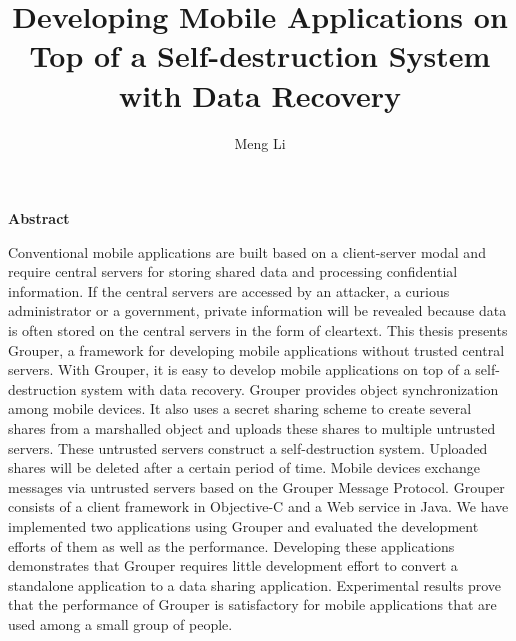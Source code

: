 \documentclass[a4paper,11pt]{report}
\title{Developing Mobile Applications on Top of a Self-destruction System with Data Recovery}
\author{Meng Li}
\begin{document}
		
\maketitle
\thispagestyle{empty}
\newpage

\thispagestyle{empty}
\vspace*{20pt plus 1fil}
\noindent
\begin{center}
{\bf Abstract}
\vspace{5mm}
\end{center}
Conventional mobile applications are built based on a client-server modal and require central servers for storing shared data and processing confidential information.
If the central servers are accessed by an attacker, a curious administrator or a government, private information will be revealed because data is often stored on the central servers in the form of cleartext.
This thesis presents Grouper, a framework for developing mobile applications without trusted central servers.
With Grouper, it is easy to develop mobile applications on top of a self-destruction system with data recovery.
Grouper provides object synchronization among mobile devices.
It also uses a secret sharing scheme to create several shares from a marshalled object and uploads these shares to multiple untrusted servers. 
These untrusted servers construct a self-destruction system. 
Uploaded shares will be deleted after a certain period of time. 
Mobile devices exchange messages via untrusted servers based on the Grouper Message Protocol. 
Grouper consists of a client framework in Objective-C and a Web service in Java.
We have implemented two applications using Grouper and evaluated the development efforts of them as well as the performance. 
Developing these applications demonstrates that Grouper requires little development effort to convert a standalone application to a data sharing application.
Experimental results prove that the performance of Grouper is satisfactory for mobile applications that are used among a small group of people.
\par
\vspace{0pt plus 1fil}
\newpage
\end{document}
